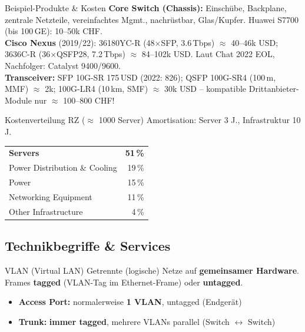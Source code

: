 \documentclass[a4paper, fontsize=7pt]{scrartcl}
\renewcommand*{\arraystretch}{1.5}  %
\begin{document}
\begin{subbox}{Beispiel-Produkte \& Kosten}
\textbf{Core Switch (Chassis):} Einschübe, Backplane, zentrale Netzteile,
vereinfachtes Mgmt., nachrüstbar, Glas/Kupfer. Huawei S7700 (bis 100\,GE):
10--50k CHF.\\
\textbf{Cisco Nexus} (2019/22): 36180YC-R (48$\times$SFP, 3.6\,Tbps)
$\approx$ 40--46k USD; 3636C-R (36$\times$QSFP28, 7.2\,Tbps)
$\approx$ 84--102k USD. Laut Chat 2022 EOL, Nachfolger: Catalyst 9400/9600.\\
\textbf{Transceiver:} SFP 10G-SR 175\,USD (2022: 826); QSFP 100G-SR4 (100\,m, MMF)
$\approx$ 2k; 100G-LR4 (10\,km, SMF) $\approx$ 30k USD -- kompatible
Drittanbieter-Module nur $\approx$ 100--800 CHF!
\end{subbox}

\begin{mainbox}{Kostenverteilung RZ ($\approx$ 1000 Server)}
Amortisation: Server 3 J., Infrastruktur 10 J.\par
\renewcommand*{\arraystretch}{1.1}
\begin{tabularx}{\linewidth}{@{}X|r@{}}
\textbf{Servers} & \textbf{51\,\%} \\
Power Distribution \& Cooling & 19\,\% \\
Power & 15\,\% \\
Networking Equipment & 11\,\% \\
Other Infrastructure & 4\,\% \\
\end{tabularx}
\end{mainbox}

\subsection{Technikbegriffe \& Services}

\begin{mainbox}{VLAN (Virtual LAN)}
Getrennte (logische) Netze auf \textbf{gemeinsamer Hardware}. Frames
\textbf{tagged} (VLAN-Tag im Ethernet-Frame) oder \textbf{untagged}.
\begin{itemize}
    \item \textbf{Access Port:} normalerweise \textbf{1 VLAN}, untagged
          (Endgerät)
    \item \textbf{Trunk:} \textbf{immer tagged}, mehrere VLANs parallel
          (Switch $\leftrightarrow$ Switch)
\end{itemize}
\end{mainbox}
\end{document}
